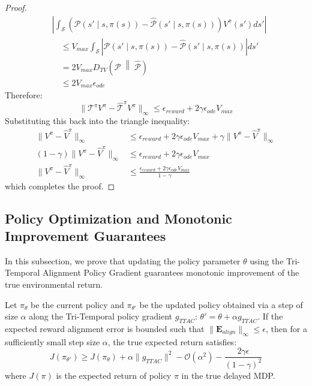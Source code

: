 \documentclass[manuscript, screen, review]{jair}
\begin{document}
\begin{proof}
\begin{align*}
    &\left| \int_{\mathcal{S}} \left( \mathcal{P}(s' \mid s, \pi(s)) - \hat{\mathcal{P}}(s' \mid s, \pi(s)) \right) V^\pi(s') ds' \right| \\
    &\quad \le V_{max} \int_{\mathcal{S}} \left| \mathcal{P}(s' \mid s, \pi(s)) - \hat{\mathcal{P}}(s' \mid s, \pi(s)) \right| ds' \\
    &\quad = 2 V_{max} D_{TV}\left( \mathcal{P} \;\middle\|\; \hat{\mathcal{P}} \right) \\
    &\quad \le 2 V_{max} \epsilon_{ode}
\end{align*}
Therefore:
\begin{equation*}
    \| \mathcal{T}^\pi V^\pi - \hat{\mathcal{T}}^\pi V^\pi \|_\infty \le \epsilon_{reward} + 2 \gamma \epsilon_{ode} V_{max}
\end{equation*}
Substituting this back into the triangle inequality:
\begin{align*}
    \| V^\pi - \hat{V}^\pi \|_\infty &\le \epsilon_{reward} + 2 \gamma \epsilon_{ode} V_{max} + \gamma \| V^\pi - \hat{V}^\pi \|_\infty \\
    (1 - \gamma) \| V^\pi - \hat{V}^\pi \|_\infty &\le \epsilon_{reward} + 2 \gamma \epsilon_{ode} V_{max} \\
    \| V^\pi - \hat{V}^\pi \|_\infty &\le \frac{\epsilon_{reward} + 2 \gamma \epsilon_{ode} V_{max}}{1 - \gamma}
\end{align*}
which completes the proof.
\end{proof}

\subsection{Policy Optimization and Monotonic Improvement Guarantees}
In this subsection, we prove that updating the policy parameter $\theta$ using the Tri-Temporal Alignment Policy Gradient guarantees monotonic improvement of the true environmental return.

\begin{theorem}
Let $\pi_\theta$ be the current policy and $\pi_{\theta'}$ be the updated policy obtained via a step of size $\alpha$ along the Tri-Temporal policy gradient $g_{TTAC}$: $\theta' = \theta + \alpha g_{TTAC}$. If the expected reward alignment error is bounded such that $\|\mathbf{E}_{align}\|_\infty \le \epsilon$, then for a sufficiently small step size $\alpha$, the true expected return satisfies:
\begin{equation}
    J(\pi_{\theta'}) \ge J(\pi_\theta) + \alpha \| g_{TTAC} \|^2 - \mathcal{O}(\alpha^2) - \frac{2 \gamma \epsilon}{(1-\gamma)^2}
\end{equation}
where $J(\pi)$ is the expected return of policy $\pi$ in the true delayed MDP.
\end{theorem}
\end{document}
